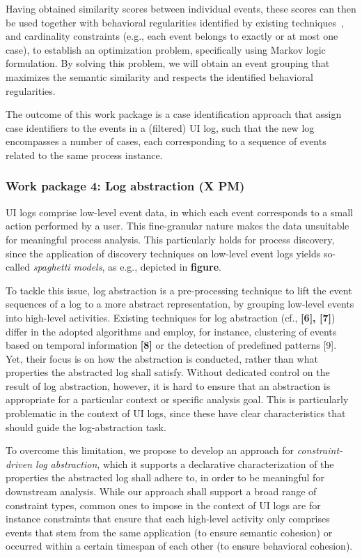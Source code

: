  Having obtained similarity scores between individual events, these scores can then be used together with behavioral regularities identified by existing techniques~\cite{ref}, and cardinality constraints (e.g., each event belongs to exactly or at most one case), to establish an optimization problem, specifically using Markov logic formulation. By solving this problem, we will obtain an event grouping that maximizes the semantic similarity and respects the identified behavioral regularities.

The outcome of this work package is a case identification approach that assign case identifiers to the events in a (filtered) UI log, such that the new log encompasses a number of cases, each corresponding to a sequence of events related to the same process instance.


\subsubsection{Work package 4: Log abstraction (X PM)}
\label{sec:wp4}

UI logs comprise low-level event data, in which each event corresponds to a small action performed by a user. This fine-granular nature makes the data unsuitable for meaningful process analysis. This particularly holds for process discovery, since the application of discovery techniques on low-level event logs yields so-called \emph{spaghetti models}, as e.g., depicted in \textbf{figure}.

To tackle this issue, log abstraction is a pre-processing technique to lift the event sequences of a log to a more abstract representation, by grouping low-level events into high-level activities. Existing techniques for log abstraction (cf., \textbf{[6], [7]}) differ in the adopted algorithms and employ, for instance, clustering of events based on temporal information \textbf{[8]} or the detection of predefined patterns [9]. Yet, their focus is on how the abstraction is conducted, rather than what properties the abstracted log shall satisfy. Without dedicated control on the result of log abstraction, however, it is hard to ensure that an abstraction is appropriate for a particular context or specific analysis goal.
This is particularly problematic in the context of UI logs, since these have clear characteristics that should guide the log-abstraction task.

To overcome this limitation, we propose to develop an approach for \emph{constraint-driven log abstraction}, which it supports a declarative characterization of the properties the abstracted log shall adhere to, in order to be meaningful for downstream analysis. While our approach shall support a broad range of constraint types, common ones to impose in the context of UI logs are for instance constraints that ensure that each high-level activity only comprises events that stem from the same application (to ensure semantic cohesion) or occurred within a certain timespan of each other (to ensure behavioral cohesion). 

